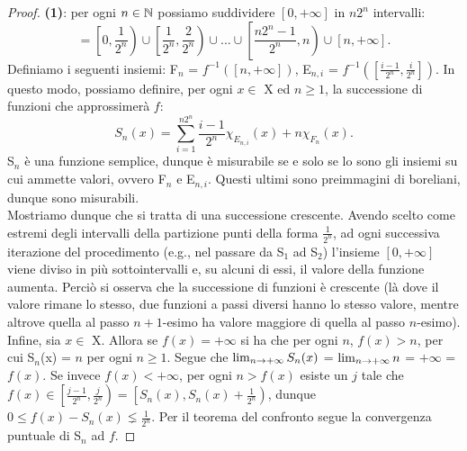 \documentclass[Completo.tex]{subfiles}
\begin{document}
\begin{proof}
	\textbf{(1)}: per ogni $n \in \bb[N]$ possiamo suddividere $[0, +\infty]$ in $n 2^n$ intervalli:
	\begin{equation*}
	[0, +\infty] = \left[0, \frac{1}{2^n}\right) \cup \left[\frac{1}{2^n}, \frac{2}{2^n}\right) \cup ... \cup \left[\frac{n2^n - 1}{2^n},n\right) \cup [n, +\infty].
	\end{equation*}
	Definiamo i seguenti insiemi: F$_n$ = $f^{-1}([n, +\infty])$, E$_{n,i}$ = $f^{-1}(\left[\frac{i-1}{2^n}, \frac{i}{2^n}\right])$. In questo modo, possiamo definire, per ogni $x \in$ X ed $n\geq1$, la successione di funzioni che approssimerà $f$:
	\begin{equation*}
	S_n(x) = \sum\limits_{i=1}^{n2^n}\frac{i-1}{2^n} \chi_{E_{n,i}}(x) + n\chi_{F_n}(x).
	\end{equation*}
	S$_n$ è una funzione semplice, dunque è misurabile se e solo se lo sono gli insiemi su cui ammette valori, ovvero F$_n$ e E$_{n,i}$. Questi ultimi sono preimmagini di boreliani, dunque sono misurabili. \\
	Mostriamo dunque che si tratta di una successione crescente. Avendo scelto come estremi degli intervalli della partizione punti della forma $\frac{1}{2^n}$, ad ogni successiva iterazione del procedimento (e.g., nel passare da S$_1$ ad S$_2$) l'insieme $[0, +\infty]$ viene diviso in più sottointervalli e, su alcuni di essi, il valore della funzione aumenta. Perciò si osserva che la successione di funzioni è crescente (là dove il valore rimane lo stesso, due funzioni a passi diversi hanno lo stesso valore, mentre altrove quella al passo $n+1$-esimo ha valore maggiore di quella al passo $n$-esimo). \\
	Infine, sia $x \in$ X. Allora se $f(x) = +\infty$ si ha che per ogni $n$, $f(x) > n$, per cui S$_n$(x) = $n$ per ogni $n\geq1$. Segue che $\lim_{n \rightarrow +\infty}S_n(x)$ = $\lim_{n \rightarrow +\infty} n$ = $+\infty$ = $f(x)$. Se invece $f(x) < +\infty$, per ogni $n > f(x)$ esiste un $j$ tale che $f(x) \in \left[\frac{j-1}{2^n}, \frac{j}{2^n}\right) = \left[S_n(x), S_n(x) + \frac{1}{2^n}\right)$, dunque $0 \leq f(x) - S_n(x) \lneq \frac{1}{2^n}$. Per il teorema del confronto segue la convergenza puntuale di S$_n$ ad $f$.
\end{proof}
\end{document}
